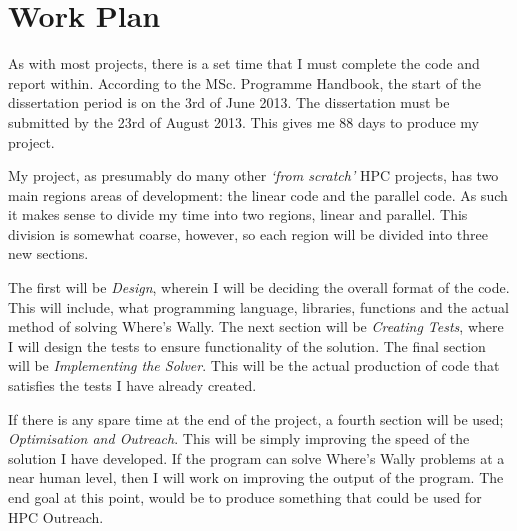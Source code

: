 \documentclass[main.tex]{subfiles}
\begin{document}
  \section{Work Plan}
    As with most projects, there is a set time that I must complete the code and report within.
    According to the MSc. Programme Handbook\cite{url:msc-handbook}, the start of the dissertation period is on the 3rd of June 2013.
    The dissertation must be submitted by the 23rd of August 2013.
    This gives me 88 days to produce my project.

    My project, as presumably do many other \emph{`from scratch'} HPC projects, has two main regions areas of development: the linear code and the parallel code.
    As such it makes sense to divide my time into two regions, linear and parallel.
    This division is somewhat coarse, however, so each region will be divided into three new sections.

    The first will be \emph{Design}, wherein I will be deciding the overall format of the code.
    This will include, what programming language, libraries, functions and the actual method of solving Where's Wally.
    The next section will be \emph{Creating Tests}, where I will design the tests to ensure functionality of the solution.
    The final section will be \emph{Implementing the Solver}.
    This will be the actual production of code that satisfies the tests I have already created.

    If there is any spare time at the end of the project, a fourth section will be used; \emph{Optimisation and Outreach}.
    This will be simply improving the speed of the solution I have developed.
    If the program can solve Where's Wally problems at a near human level, then I will work on improving the output of the program.
    The end goal at this point, would be to produce something that could be used for HPC Outreach.
\end{document}
